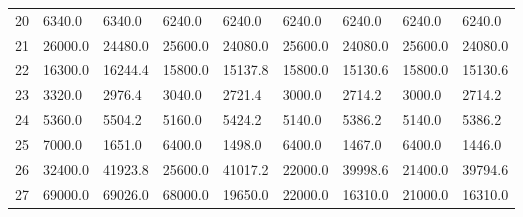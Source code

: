 \begin{tabular}{|r|l|l|l|l|l|l|l|l|}
  20 & 6340.0 & 6340.0 & 6240.0 & 6240.0 & 6240.0 & 6240.0 & 6240.0 & 6240.0 \\ 
  21 & 26000.0 & 24480.0 & 25600.0 & 24080.0 & 25600.0 & 24080.0 & 25600.0 & 24080.0 \\ 
  22 & 16300.0 & 16244.4 & 15800.0 & 15137.8 & 15800.0 & 15130.6 & 15800.0 & 15130.6 \\ 
  23 & 3320.0 & 2976.4 & 3040.0 & 2721.4 & 3000.0 & 2714.2 & 3000.0 & 2714.2 \\ 
  24 & 5360.0 & 5504.2 & 5160.0 & 5424.2 & 5140.0 & 5386.2 & 5140.0 & 5386.2 \\ 
  25 & 7000.0 & 1651.0 & 6400.0 & 1498.0 & 6400.0 & 1467.0 & 6400.0 & 1446.0 \\ 
  26 & 32400.0 & 41923.8 & 25600.0 & 41017.2 & 22000.0 & 39998.6 & 21400.0 & 39794.6 \\ 
  27 & 69000.0 & 69026.0 & 68000.0 & 19650.0 & 22000.0 & 16310.0 & 21000.0 & 16310.0 \\ 
\end{tabular}
